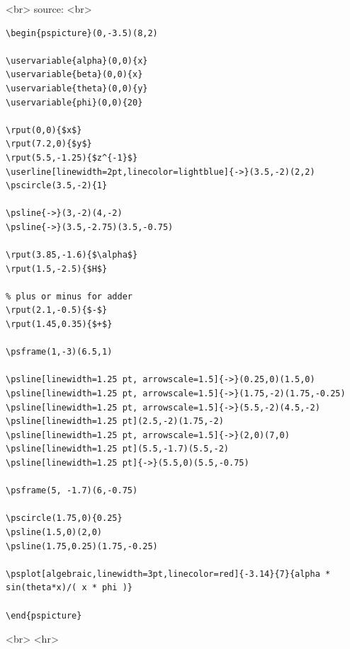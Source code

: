 <br>
source:
<br>
\begin{verbatim}
\begin{pspicture}(0,-3.5)(8,2)

\uservariable{alpha}(0,0){x}
\uservariable{beta}(0,0){x}
\uservariable{theta}(0,0){y}
\uservariable{phi}(0,0){20}

\rput(0,0){$x$}
\rput(7.2,0){$y$}
\rput(5.5,-1.25){$z^{-1}$}
\userline[linewidth=2pt,linecolor=lightblue]{->}(3.5,-2)(2,2)
\pscircle(3.5,-2){1}

\psline{->}(3,-2)(4,-2)
\psline{->}(3.5,-2.75)(3.5,-0.75)

\rput(3.85,-1.6){$\alpha$}
\rput(1.5,-2.5){$H$}

% plus or minus for adder
\rput(2.1,-0.5){$-$}
\rput(1.45,0.35){$+$}

\psframe(1,-3)(6.5,1)

\psline[linewidth=1.25 pt, arrowscale=1.5]{->}(0.25,0)(1.5,0)
\psline[linewidth=1.25 pt, arrowscale=1.5]{->}(1.75,-2)(1.75,-0.25)
\psline[linewidth=1.25 pt, arrowscale=1.5]{->}(5.5,-2)(4.5,-2)
\psline[linewidth=1.25 pt](2.5,-2)(1.75,-2)
\psline[linewidth=1.25 pt, arrowscale=1.5]{->}(2,0)(7,0)
\psline[linewidth=1.25 pt](5.5,-1.7)(5.5,-2)
\psline[linewidth=1.25 pt]{->}(5.5,0)(5.5,-0.75)

\psframe(5, -1.7)(6,-0.75)

\pscircle(1.75,0){0.25}
\psline(1.5,0)(2,0)
\psline(1.75,0.25)(1.75,-0.25)

\psplot[algebraic,linewidth=3pt,linecolor=red]{-3.14}{7}{alpha * sin(theta*x)/( x * phi )}

\end{pspicture}

\end{verbatim}
<br>
<hr>
